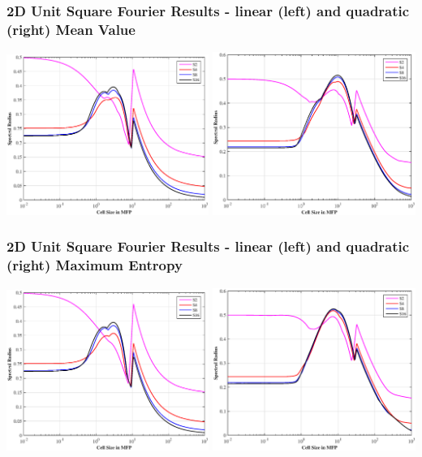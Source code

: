 \documentclass[compress,10pt]{beamer}
\begin{document}
\begin{frame}[t]
{}
{
\frametitle{\small 2D Unit Square Fourier Results - linear (left) and quadratic (right) Mean Value}
\vspace{1cm}
\includegraphics[width=0.495\textwidth]{images/SI_MIP_quad_C=4_UMV1_LS.eps}
\includegraphics[width=0.495\textwidth]{images/SI_MIP_quad_C=4_UMV2_LS.eps}
}
{
\frametitle{\small 2D Unit Square Fourier Results - linear (left) and quadratic (right) Maximum Entropy}
\vspace{1cm}
\includegraphics[width=0.495\textwidth]{images/SI_MIP_quad_C=4_MAXENT1_LS.eps}
\includegraphics[width=0.495\textwidth]{images/SI_MIP_quad_C=4_UMAXENT2_LS.eps}
}
\end{frame}
\end{document}

